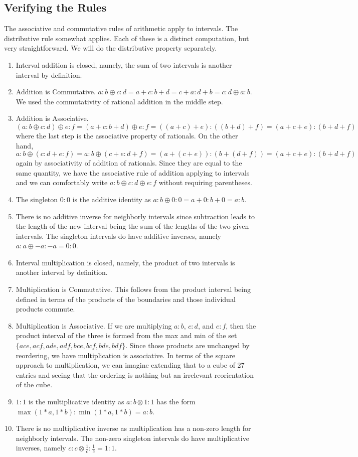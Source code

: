 \documentclass[12pt]{article}
\begin{document}
\subsection{Verifying the Rules}\label{sec:rules}

The associative and commutative rules of arithmetic apply to intervals. The distributive rule somewhat applies. Each of these is a distinct computation, but very straightforward. We will do the distributive property separately. 

\begin{enumerate}
    \item Interval addition is closed, namely, the sum of two intervals is another interval by definition. 
    \item Addition is Commutative. $a:b \oplus c:d= a+c : b+d = c+a:d+b = c:d \oplus a:b$. We used the commutativity of rational addition in the middle step. 
    \item Addition is Associative. $(a:b \oplus c:d) \oplus e:f = (a+c:b+d) \oplus e:f = ((a+c)+e):((b+d)+f) = (a+c+e):(b+d+f)$ where the last step is the associative property of rationals.  On the other hand, $a:b \oplus (c:d+e:f) = a:b \oplus (c+e:d+f) = (a+(c+e)):(b+(d+f)) = (a+c+e):(b+d+f)$ again by associativity of addition of rationals. Since they are equal to the same quantity, we have the associative rule of addition applying to intervals and we can comfortably write $a:b \oplus c:d \oplus e:f$ without requiring parentheses. 
    \item The singleton $0:0$ is the additive identity as $a:b \oplus 0:0 = a+0:b+0 = a:b$. 
    \item There is no additive inverse for neighborly intervals since subtraction leads to the length of the new interval being the sum of the lengths of the two given intervals. The singleton intervals do have additive inverses, namely $a:a \oplus -a:-a = 0:0$. 
    \item Interval multiplication is closed, namely, the product of two intervals is another interval by definition. 
    \item Multiplication is Commutative. This follows from the product interval being defined in terms of the products of the boundaries and those individual products commute. 
    \item Multiplication is Associative. If we are multiplying $a:b$, $c:d$, and $e:f$, then the product interval of the three is formed from the max and min of the set $\{ace, acf, ade, adf, bce, bcf, bde, bdf\}$. Since those products are unchanged by reordering, we have multiplication is associative. In terms of the square approach to multiplication, we can imagine extending that to a cube of 27 entries and seeing that the ordering is nothing but an irrelevant reorientation of the cube. 
    \item $1:1$ is the multiplicative identity as $a:b \otimes 1:1$ has the form $\max(1*a, 1*b):\min(1*a, 1*b) = a:b$. 
    \item There is no multiplicative inverse as multiplication has a non-zero length for neighborly intervals. The non-zero singleton intervals do have multiplicative inverses, namely $c:c  \otimes  \frac{1}{c} : \frac{1}{c} = 1:1$.
\end{enumerate}
\end{document}
